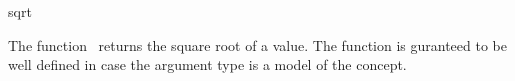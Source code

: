 \begin{ccRefFunction}{sqrt}

\ccDefinition

The function \ccRefName\ returns the square root of a value.
The function is guranteed to be well defined in case the argument type 
is a model of the  concept. 


{}



\ccSeeAlso

\\
\\

\end{ccRefFunction}
